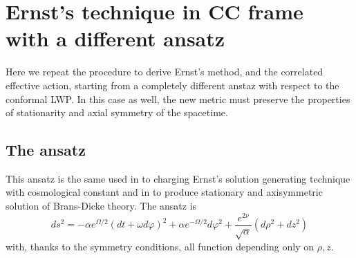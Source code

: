 
\chapter{Ernst's technique in CC frame with a different ansatz} \label{appendice A}
Here we repeat the procedure to derive Ernst's method, and the correlated effective action, starting from a completely different anstaz with respect to the conformal LWP. In this case as well, the new metric must preserve the properties of stationarity and axial symmetry of the spacetime.
\section{The ansatz}
This ansatz is the same used in \citep{charging} to charging Ernst’s solution generating technique with cosmological constant and in \citep{Delice_stationary} to produce stationary and axisymmetric solution of Brans-Dicke theory. 
The ansatz is
\begin{equation}
        ds^2 = -\alpha e^{\Omega/2} (dt + \omega d\varphi)^2 + \alpha e^{-\Omega/2}d\varphi^2 + \frac{e^{2\nu}}{\sqrt{\alpha}}(d\rho^2+dz^2) 
        \label{ansatz_charging}
\end{equation}
with, thanks to the symmetry conditions, all function depending only on $\rho, z$.
